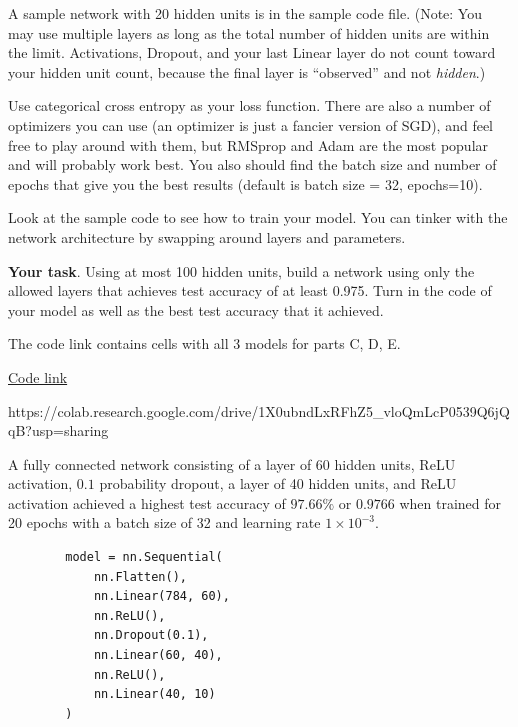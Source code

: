 A sample network with 20 hidden units is in the sample code file. (Note: You may use multiple layers as long as the total number of hidden units are within the limit. Activations, Dropout, and your last Linear layer do not count toward your hidden unit count, because the final layer is ``observed'' and not \emph{hidden}.)

Use categorical cross entropy as your loss function. There are also a number of optimizers  you can use (an optimizer is just a fancier version of SGD), and feel free to play around with them, but RMSprop and Adam are the most popular and will probably work best. You also should find the batch size and number of epochs that give you the best results (default is batch size = 32, epochs=10).

Look at the sample code to see how to train your model. You can tinker with the network architecture by swapping around layers and parameters.

\textbf{Your task}. Using at most 100 hidden units, build a network using only the allowed layers that achieves test accuracy of at least 0.975. Turn in the code of your model as well as the best test accuracy that it achieved.



\begin{solution}
    The code link contains cells with all 3 models for parts C, D, E.

    \href{https://colab.research.google.com/drive/1X0ubndLxRFhZ5_vloQmLcP0539Q6jQqB?usp=sharing}{Code link}

    https://colab.research.google.com/drive/1X0ubndLxRFhZ5_vloQmLcP0539Q6jQqB?usp=sharing

    A fully connected network consisting of a layer of 60 hidden units, ReLU activation, $0.1$ probability dropout, a layer of 40 hidden units, and ReLU activation achieved a highest test accuracy of $97.66\%$ or $\boxed{0.9766}$ when trained for 20 epochs with a batch size of 32 and learning rate $1 \times 10^{-3}$.

    \begin{verbatim}
        model = nn.Sequential(
            nn.Flatten(),  
            nn.Linear(784, 60),
            nn.ReLU(),
            nn.Dropout(0.1),
            nn.Linear(60, 40),
            nn.ReLU(),
            nn.Linear(40, 10)
        )
    \end{verbatim}
\end{solution}

\newpage

